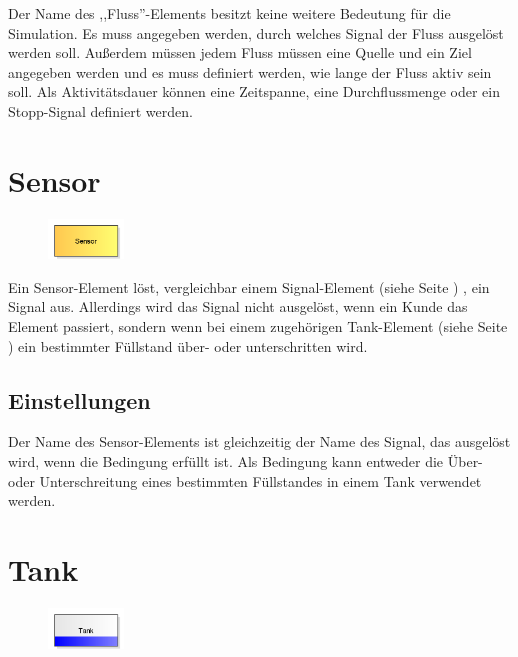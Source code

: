 Der Name des ,,Fluss''-Elements besitzt keine weitere Bedeutung für die Simulation.
Es muss angegeben werden, durch welches Signal der Fluss ausgelöst werden soll.
Außerdem müssen jedem Fluss müssen eine Quelle und ein Ziel angegeben werden und es muss
definiert werden, wie lange der Fluss aktiv sein soll. Als Aktivitätsdauer
können eine Zeitspanne, eine Durchflussmenge oder ein Stopp-Signal definiert werden.


\section{Sensor}
\label{ref:ModelElementTankSensor}

\begin{figure}
\vspace{-22pt}
\includegraphics[width=2cm]{imageModelElementTankSensor.png}
\vspace{-22pt}
\end{figure}

Ein Sensor-Element löst, vergleichbar einem Signal-Element (siehe Seite \pageref{ref:ModelElementSignal}) ,
ein Signal aus. Allerdings wird das Signal nicht ausgelöst, wenn ein Kunde das Element
passiert, sondern wenn bei einem zugehörigen Tank-Element (siehe Seite \pageref{ref:ModelElementTank}) 
ein bestimmter Füllstand über- oder unterschritten wird. 

\subsection*{Einstellungen}

Der Name des Sensor-Elements ist gleichzeitig der Name des Signal, das ausgelöst wird, wenn die Bedingung erfüllt ist.
Als Bedingung kann entweder die Über- oder Unterschreitung eines bestimmten Füllstandes in einem
Tank verwendet werden.


\section{Tank}
\label{ref:ModelElementTank}

\begin{figure}
\vspace{-22pt}
\includegraphics[width=2cm]{imageModelElementTank.png}
\vspace{-22pt}
\end{figure}

